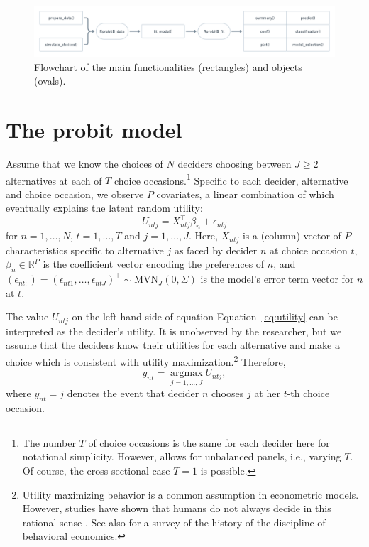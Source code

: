 \documentclass[article,shortnames]{jss}
\begin{document}
\begin{figure}[!ht]
  \centering
  \includegraphics[width=1.0\textwidth]{flowchart.png}
  \caption{Flowchart of the main  functionalities (rectangles) and objects (ovals).}
  \label{fig:flowchart}
\end{figure}

\section{The probit model} \label{sec:probit_model}

Assume that we know the choices of $N$ deciders choosing between $J \geq 2$ alternatives at each of $T$ choice occasions.\footnote{The number $T$ of choice occasions is the same for each decider here for notational simplicity. However,  allows for unbalanced panels, i.e., varying $T$. Of course, the cross-sectional case $T = 1$ is possible.} Specific to each decider, alternative and choice occasion, we observe $P$ covariates, a linear combination of which eventually explains the latent random utility:
%
\begin{equation}
  \label{eq:utility}
  U_{ntj} = X_{ntj}^\top \beta_n + \epsilon_{ntj}
\end{equation}
%
for $n=1,\dots,N$, $t=1,\dots,T$ and $j=1,\dots,J$. Here, $X_{ntj}$ is a (column) vector of $P$ characteristics specific to alternative $j$ as faced by decider $n$ at choice occasion $t$, $\beta_n \in \mathbb{R}^{P}$ is the coefficient vector encoding the preferences of $n$, and $(\epsilon_{nt:}) = (\epsilon_{nt1},\dots,\epsilon_{ntJ})^\top \sim \text{MVN}_{J} (0,\Sigma)$ is the model's error term vector for $n$ at $t$.

The value $U_{ntj}$ on the left-hand side of equation Equation~\ref{eq:utility} can be interpreted as the decider's utility. It is unobserved by the researcher, but we assume that the deciders know their utilities for each alternative and make a choice which is consistent with utility maximization.\footnote{Utility maximizing behavior is a common assumption in econometric models. However, studies have shown that humans do not always decide in this rational sense \citep{Tversky:1986, Hewig:2011}. See also \citep{Thaler:2015} for a survey of the history of the discipline of behavioral economics.} Therefore,
%
\begin{equation}
   \label{eq:link}
   y_{nt} = \operatorname*{argmax}_{j = 1,\dots,J} U_{ntj},
\end{equation}
%
where $y_{nt}=j$ denotes the event that decider $n$ chooses $j$ at her $t$-th choice occasion.
\end{document}
